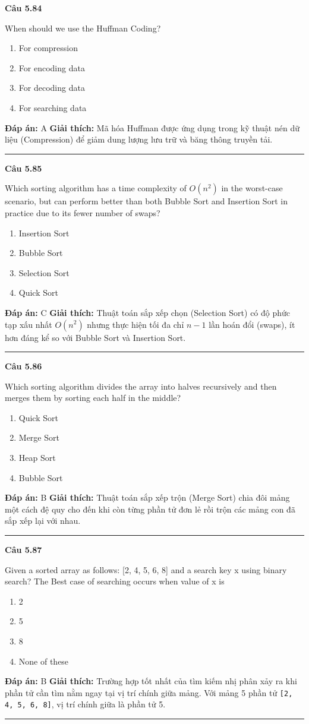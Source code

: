 \documentclass[11pt,a4paper]{article}
\newenvironment{question}[1]{%
  \par\vspace{1em}\noindent\textbf{\large Câu #1}\par\vspace{0.4em}
}{%
  \par\vspace{1em}\hrule\vspace{0.6em}
}
\newenvironment{choices}{%
  \begin{enumerate}[label=\textbf{\Alph*.},leftmargin=2.2em,itemsep=2pt,topsep=3pt]
}{%
  \end{enumerate}
}
\newcommand{\choice}{\item}
\begin{document}
\begin{question}{5.84}
When should we use the Huffman Coding?
\begin{choices}
\choice For compression
\choice For encoding data
\choice For decoding data
\choice For searching data
\end{choices}
\textbf{Đáp án:} A
\textbf{Giải thích:} Mã hóa Huffman được ứng dụng trong kỹ thuật nén dữ liệu (Compression) để giảm dung lượng lưu trữ và băng thông truyền tải.
\end{question}

\begin{question}{5.85}
Which sorting algorithm has a time complexity of $O(n^2)$ in the worst-case scenario, but can perform better than both Bubble Sort and Insertion Sort in practice due to its fewer number of swaps?
\begin{choices}
\choice Insertion Sort
\choice Bubble Sort
\choice Selection Sort
\choice Quick Sort
\end{choices}
\textbf{Đáp án:} C
\textbf{Giải thích:} Thuật toán sắp xếp chọn (Selection Sort) có độ phức tạp xấu nhất $O(n^2)$ nhưng thực hiện tối đa chỉ $n - 1$ lần hoán đổi (swaps), ít hơn đáng kể so với Bubble Sort và Insertion Sort.
\end{question}

\begin{question}{5.86}
Which sorting algorithm divides the array into halves recursively and then merges them by sorting each half in the middle?
\begin{choices}
\choice Quick Sort
\choice Merge Sort
\choice Heap Sort
\choice Bubble Sort
\end{choices}
\textbf{Đáp án:} B
\textbf{Giải thích:} Thuật toán sắp xếp trộn (Merge Sort) chia đôi mảng một cách đệ quy cho đến khi còn từng phần tử đơn lẻ rồi trộn các mảng con đã sắp xếp lại với nhau.
\end{question}

\begin{question}{5.87}
Given a sorted array as follows: [2, 4, 5, 6, 8] and a search key x using binary search? The Best case of searching occurs when value of x is
\begin{choices}
\choice 2
\choice 5
\choice 8
\choice None of these
\end{choices}
\textbf{Đáp án:} B
\textbf{Giải thích:} Trường hợp tốt nhất của tìm kiếm nhị phân xảy ra khi phần tử cần tìm nằm ngay tại vị trí chính giữa mảng. Với mảng 5 phần tử \texttt{[2, 4, 5, 6, 8]}, vị trí chính giữa là phần tử 5.
\end{question}
\end{document}
